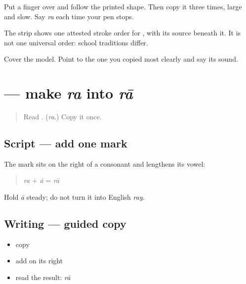 Put a finger over \textbf{} and follow the printed shape. Then copy it three times, large and slow. Say \emph{ra} each time your pen stops.

The strip shows one attested stroke order for \textbf{}, with its source beneath it. It is not one universal order: school traditions differ.

\begin{tcolorbox}[breakable,colback=teal!4,colframe=teal!35!black,title={Before you move on}]
Cover the model. Point to the one you copied most clearly and say its sound.
\end{tcolorbox}
\section[\texorpdfstring{\mw{ा} (ā)}{ा (ā)}]{ — make \emph{ra} into \emph{rā}}

\label{lesson:MW-W01-aa-matra}



\begin{quote}
Read \textbf{}. (\emph{ra}.) Copy it once.
\end{quote}

\subsection*{Script — add one mark}
The mark \textbf{} sits on the right of a consonant and lengthens its vowel:

\begin{quote}
\textbf{} \emph{ra} + \textbf{} \emph{ā} = \textbf{} \emph{rā}
\end{quote}

Hold \emph{ā} steady; do not turn it into English \emph{ray}.

\subsection*{Writing — guided copy}

\begin{itemize}
\raggedright
  \item copy \textbf{}
  \item add \textbf{} on its right
  \item read the result: \textbf{} \emph{rā}
\end{itemize}

